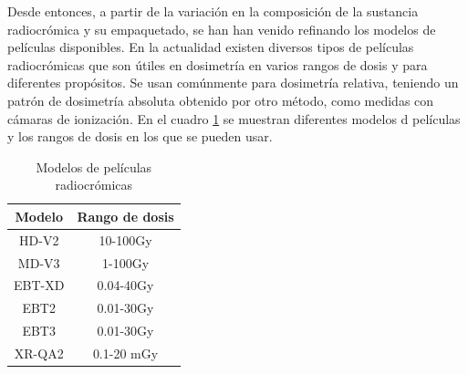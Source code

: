 Desde entonces, a partir de la variación en la composición de la sustancia radiocrómica y su empaquetado, se han han venido refinando los modelos de películas disponibles. En la actualidad existen diversos tipos de películas radiocrómicas que son útiles en dosimetría en varios rangos de dosis y para diferentes propósitos. Se usan comúnmente para dosimetría relativa, teniendo un patrón de dosimetría absoluta obtenido por otro método, como medidas con cámaras de ionización. En el cuadro \ref{tab:Modelos} se muestran diferentes modelos d películas y los rangos de dosis en los que se pueden usar.\\
\begin{table}[h!]
	\centering
	\begin{tabular}{|c|c|}
		
		\hline 
		Modelo & Rango de dosis \\ 
		\hline 
		HD-V2 & 10-100Gy \\ 
		\hline 
		MD-V3 & 1-100Gy \\ 
		\hline 
		EBT-XD & 0.04-40Gy \\ 
		\hline 
		EBT2 & 0.01-30Gy \\ 
		\hline 
		EBT3 & 0.01-30Gy \\ 
		\hline 
		XR-QA2 & 0.1-20 mGy \\ 
		\hline 
	\end{tabular} 
\caption{Modelos de películas radiocrómicas}
\label{tab:Modelos}
\end{table}

